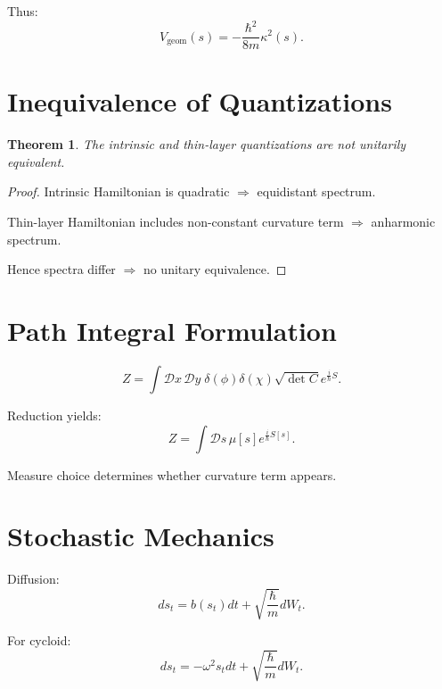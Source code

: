 \documentclass[11pt]{article}
\newtheorem{theorem}{Theorem}
\begin{document}
Thus:
\begin{equation}
V_{\text{geom}}(s) = -\frac{\hbar^2}{8m}\kappa^2(s).
\end{equation}

\section{Inequivalence of Quantizations}

\begin{theorem}
The intrinsic and thin-layer quantizations are not unitarily equivalent.
\end{theorem}

\begin{proof}
Intrinsic Hamiltonian is quadratic $\Rightarrow$ equidistant spectrum.

Thin-layer Hamiltonian includes non-constant curvature term $\Rightarrow$ anharmonic spectrum.

Hence spectra differ $\Rightarrow$ no unitary equivalence.
\end{proof}

\section{Path Integral Formulation}

\begin{equation}
Z = \int \mathcal{D}x\,\mathcal{D}y\;
\delta(\phi)\delta(\chi)
\sqrt{\det C}
e^{\frac{i}{\hbar}S}.
\end{equation}

Reduction yields:
\begin{equation}
Z = \int \mathcal{D}s\,\mu[s] e^{\frac{i}{\hbar}S[s]}.
\end{equation}

Measure choice determines whether curvature term appears.

\section{Stochastic Mechanics}

Diffusion:
\begin{equation}
ds_t = b(s_t)dt + \sqrt{\frac{\hbar}{m}} dW_t.
\end{equation}

For cycloid:
\begin{equation}
ds_t = -\omega^2 s_t dt + \sqrt{\frac{\hbar}{m}} dW_t.
\end{equation}
\end{document}

